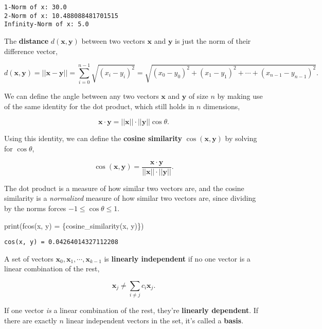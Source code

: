 \documentclass[
  letterpaper,
  DIV=11,
  numbers=noendperiod]{scrreprt}
\newenvironment{Shaded}{\begin{snugshade}}{\end{snugshade}}
\newcommand{\BuiltInTok}[1]{\textcolor[rgb]{0.00,0.23,0.31}{#1}}
\newcommand{\NormalTok}[1]{\textcolor[rgb]{0.00,0.23,0.31}{#1}}
\newcommand{\SpecialCharTok}[1]{\textcolor[rgb]{0.37,0.37,0.37}{#1}}
\newcommand{\SpecialStringTok}[1]{\textcolor[rgb]{0.13,0.47,0.30}{#1}}
\begin{document}
\begin{verbatim}
1-Norm of x: 30.0
2-Norm of x: 10.488088481701515
Infinity-Norm of x: 5.0
\end{verbatim}

The \textbf{distance} \(d(\mathbf{x}, \mathbf{y})\) between two vectors
\(\mathbf{x}\) and \(\mathbf{y}\) is just the norm of their difference
vector,

\[d(\mathbf{x}, \mathbf{y}) = ||\mathbf{x}-\mathbf{y}|| = \sum_{i=0}^{n-1} \sqrt{(x_i-y_i)^2} = \sqrt{(x_0-y_0)^2 + (x_1-y_1)^2 + \cdots + (x_{n-1}-y_{n-1})^2}.\]

We can define the angle between any two vectors \(\mathbf{x}\) and
\(\mathbf{y}\) of size \(n\) by making use of the same identity for the
dot product, which still holds in \(n\) dimensions,

\[\mathbf{x} \cdot \mathbf{y} = ||\mathbf{x}|| \cdot ||\mathbf{y}|| \cos \theta.\]

Using this identity, we can define the \textbf{cosine similarity}
\(\cos(\mathbf{x}, \mathbf{y})\) by solving for \(\cos \theta\),

\[\cos(\mathbf{x}, \mathbf{y}) = \frac{\mathbf{x} \cdot \mathbf{y}}{||\mathbf{x}|| \cdot ||\mathbf{y}||}.\]

The dot product is a measure of how similar two vectors are, and the
cosine similarity is a \emph{normalized} measure of how similar two
vectors are, since dividing by the norms forces
\(-1 \leq \cos \theta \leq 1\).

\begin{Shaded}
\begin{Highlighting}[]
\BuiltInTok{print}\NormalTok{(}\SpecialStringTok{f\textquotesingle{}cos(x, y) = }\SpecialCharTok{\{}\NormalTok{cosine\_similarity(x, y)}\SpecialCharTok{\}}\SpecialStringTok{\textquotesingle{}}\NormalTok{)}
\end{Highlighting}
\end{Shaded}

\begin{verbatim}
cos(x, y) = 0.04264014327112208
\end{verbatim}

A set of vectors
\(\mathbf{x}_0, \mathbf{x}_1, \cdots, \mathbf{x}_{k-1}\) is
\textbf{linearly independent} if no one vector is a linear combination
of the rest,

\[\mathbf{x}_j \neq \sum_{i \neq j} c_i \mathbf{x}_j.\]

If one vector \emph{is} a linear combination of the rest, they're
\textbf{linearly dependent}. If there are exactly \(n\) linear
independent vectors in the set, it's called a \textbf{basis}.
\end{document}

